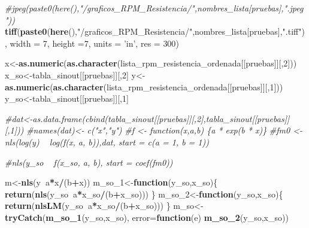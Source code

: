 \documentclass[]{article}
\newenvironment{Shaded}{\begin{snugshade}}{\end{snugshade}}
\newcommand{\KeywordTok}[1]{\textcolor[rgb]{0.13,0.29,0.53}{\textbf{#1}}}
\newcommand{\DataTypeTok}[1]{\textcolor[rgb]{0.13,0.29,0.53}{#1}}
\newcommand{\DecValTok}[1]{\textcolor[rgb]{0.00,0.00,0.81}{#1}}
\newcommand{\StringTok}[1]{\textcolor[rgb]{0.31,0.60,0.02}{#1}}
\newcommand{\CommentTok}[1]{\textcolor[rgb]{0.56,0.35,0.01}{\textit{#1}}}
\newcommand{\ControlFlowTok}[1]{\textcolor[rgb]{0.13,0.29,0.53}{\textbf{#1}}}
\newcommand{\OperatorTok}[1]{\textcolor[rgb]{0.81,0.36,0.00}{\textbf{#1}}}
\newcommand{\NormalTok}[1]{#1}
\begin{document}
\begin{Shaded}
\begin{Highlighting}[]
{{{    \CommentTok{#jpeg(paste0(here(),"/graficos_RPM_Resistencia/",nombres_lista[pruebas],".jpeg"))}
    \KeywordTok{tiff}\NormalTok{(}\KeywordTok{paste0}\NormalTok{(}\KeywordTok{here}\NormalTok{(),}\StringTok{"/graficos_RPM_Resistencia/"}\NormalTok{,nombres_lista[pruebas],}\StringTok{".tiff"}\NormalTok{), }\DataTypeTok{width =} \DecValTok{7}\NormalTok{, }\DataTypeTok{height =}\DecValTok{7}\NormalTok{, }\DataTypeTok{units =} \StringTok{'in'}\NormalTok{, }\DataTypeTok{res =} \DecValTok{300}\NormalTok{)}
    
    
    
\NormalTok{    x<-}\KeywordTok{as.numeric}\NormalTok{(}\KeywordTok{as.character}\NormalTok{(lista_rpm_resistencia_ordenada[[pruebas]][,}\DecValTok{2}\NormalTok{]))}
\NormalTok{    x_so<-tabla_sinout[[pruebas]][,}\DecValTok{2}\NormalTok{]}
\NormalTok{    y<-}\StringTok{ }\KeywordTok{as.numeric}\NormalTok{(}\KeywordTok{as.character}\NormalTok{(lista_rpm_resistencia_ordenada[[pruebas]][,}\DecValTok{1}\NormalTok{]))}
\NormalTok{    y_so<-tabla_sinout[[pruebas]][,}\DecValTok{1}\NormalTok{]}
    
    \CommentTok{#dat<-as.data.frame(cbind(tabla_sinout[[pruebas]][,2],tabla_sinout[[pruebas]][,1]))}
    \CommentTok{#names(dat)<- c("x","y")}
    \CommentTok{#f <- function(x,a,b) \{a * exp(b * x)\}}
    \CommentTok{#fm0 <- nls(log(y) ~ log(f(x, a, b)),dat, start = c(a = 1, b = 1))}
    
    \CommentTok{#nls(y_so ~ f(x_so, a, b), start = coef(fm0))}
    
    
\NormalTok{    m<-}\KeywordTok{nls}\NormalTok{(y}\OperatorTok{~}\NormalTok{a}\OperatorTok{*}\NormalTok{x}\OperatorTok{/}\NormalTok{(b}\OperatorTok{+}\NormalTok{x))}
\NormalTok{    m_so_}\DecValTok{1}\NormalTok{<-}\ControlFlowTok{function}\NormalTok{(y_so,x_so)\{}
      \KeywordTok{return}\NormalTok{(}\KeywordTok{nls}\NormalTok{(y_so}\OperatorTok{~}\NormalTok{a}\OperatorTok{*}\NormalTok{x_so}\OperatorTok{/}\NormalTok{(b}\OperatorTok{+}\NormalTok{x_so)))}
\NormalTok{    \}}
\NormalTok{    m_so_}\DecValTok{2}\NormalTok{<-}\ControlFlowTok{function}\NormalTok{(y_so,x_so)\{}
      \KeywordTok{return}\NormalTok{(}\KeywordTok{nlsLM}\NormalTok{(y_so}\OperatorTok{~}\NormalTok{a}\OperatorTok{*}\NormalTok{x_so}\OperatorTok{/}\NormalTok{(b}\OperatorTok{+}\NormalTok{x_so)))}
\NormalTok{    \}}
\NormalTok{    m_so<-}\KeywordTok{tryCatch}\NormalTok{(}\KeywordTok{m_so_1}\NormalTok{(y_so,x_so), }\DataTypeTok{error=}\ControlFlowTok{function}\NormalTok{(e) }\KeywordTok{m_so_2}\NormalTok{(y_so,x_so))}
    
}}}
\end{Highlighting}
\end{Shaded}
\end{document}
